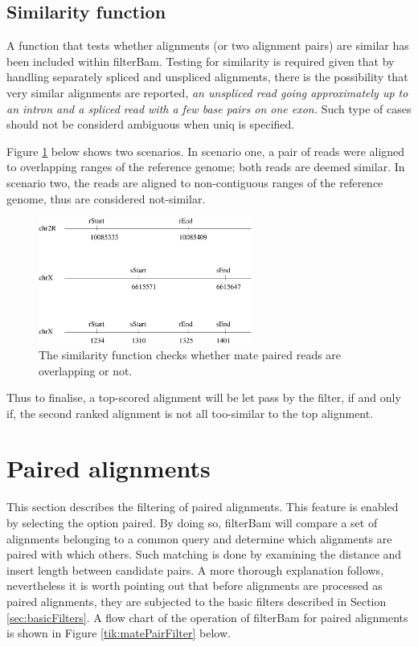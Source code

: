 \documentclass[11pt]{article}
\newcommand{\option}[1]{{\fontfamily{phv}\selectfont#1}}
\begin{document}
{\subsection{Similarity function}
A function that tests whether alignments (or two alignment pairs) are similar has been included within 
filterBam. Testing for similarity is required given that by handling separately spliced and unspliced 
alignments, there is the possibility that very similar alignments are reported, \emph{an unspliced read going approximately up to an intron and a spliced read with a few base pairs on one exon.} Such type of cases 
should not be considerd ambiguous when \option{uniq} is specified. 

Figure \ref{fig:similarityFunction} below shows two scenarios. In scenario one, a pair of reads were aligned 
to overlapping ranges of the reference genome; both reads are deemed similar. In scenario two, the reads 
are aligned to non-contiguous ranges of the reference genome, thus are considered not-similar.

\begin{figure}
  \begin{center}
    \includegraphics[width=7cm]{figures/similarFunction.pdf}
  \end{center}
\caption{The similarity function checks whether mate paired reads are overlapping or not.}
\label{fig:similarityFunction}
\end{figure}

Thus to finalise, a top-scored alignment will be let pass by the filter, if and only if, the second ranked 
alignment is not all too-similar to the top alignment.

\section{Paired alignments} \label{sec:pairedAls}

This section describes the filtering of paired alignments. This feature is enabled by selecting the option  
\option{paired}. By doing so, filterBam will compare a set of alignments belonging to a common query and 
determine which alignments are paired with which others. Such matching is done by examining the distance and 
insert length between candidate pairs. A more thorough explanation follows, nevertheless it is worth 
pointing out that before alignments are processed as paired alignments, they are subjected to the basic 
filters described in Section \ref{sec:basicFilters}. A flow chart of the operation of filterBam for paired 
alignments is shown in Figure \ref{tik:matePairFilter} below.


}
\end{document}
